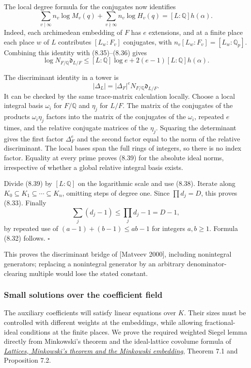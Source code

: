 \documentclass[
  11pt,
  a4paper,
]{article}
\begin{document}
The local degree formula for the conjugates now identifies \[
\sum_{v\mid\infty}n_v\log M_v(q)
+\sum_{v\nmid\infty}n_v\log H_v(q)
=[L:\mathbb Q]h(\alpha).
\] Indeed, each archimedean embedding of \(F\) has \(e\) extensions, and
at a finite place each place \(w\) of \(L\) contributes \([L_w:F_v]\)
conjugates, with \(n_v[L_w:F_v]=[L_w:\mathbb Q_p]\). Combining this
identity with (8.35)--(8.36) gives \[
\log N_{F/\mathbb Q}\mathfrak d_{L/F}
\le [L:\mathbb Q]\log e+
2(e-1)[L:\mathbb Q]h(\alpha).
\tag{8.38}
\]

The discriminant identity in a tower is \[
|\Delta_L|=|\Delta_F|^e
N_{F/\mathbb Q}\mathfrak d_{L/F}.
\tag{8.39}
\] It can be checked by the same trace-matrix calculation locally.
Choose a local integral basis \(\omega_i\) for \(F/\mathbb Q\) and
\(\eta_j\) for \(L/F\). The matrix of the conjugates of the products
\(\omega_i\eta_j\) factors into the matrix of the conjugates of the
\(\omega_i\), repeated \(e\) times, and the relative conjugate matrices
of the \(\eta_j\). Squaring the determinant gives the first factor
\(\Delta_F^e\) and the second factor equal to the norm of the relative
discriminant. The local bases span the full rings of integers, so there
is no index factor. Equality at every prime proves (8.39) for the
absolute ideal norms, irrespective of whether a global relative integral
basis exists.

Divide (8.39) by \([L:\mathbb Q]\) on the logarithmic scale and use
(8.38). Iterate along \(K_0\subseteq K_1\subseteq\cdots\subseteq K_n\),
omitting steps of degree one. Since \(\prod d_j=D\), this proves (8.33).
Finally \[
\sum_j(d_j-1)\le\prod_jd_j-1=D-1,
\] by repeated use of \((a-1)+(b-1)\le ab-1\) for integers \(a,b\ge1\).
Formula (8.32) follows. \(\square\)

This proves the discriminant bridge of {[}Matveev 2000{]}, including
nonintegral generators; replacing a nonintegral generator by an
arbitrary denominator-clearing multiple would lose the stated constant.

\subsubsection{Small solutions over the coefficient
field}\label{small-solutions-over-the-coefficient-field}

The auxiliary coefficients will satisfy linear equations over \(K\).
Their sizes must be controlled with different weights at the embeddings,
while allowing fractional-ideal conditions at the finite places. We
prove the required weighted Siegel lemma directly from Minkowski's
theorem and the ideal-lattice covolume formula of
\href{https://kokunoyumeto.github.io/open-math-courses-public/courses/NT-ANT/lattices-minkowskis-theorem-and-the-minkowski-embedding.html}{\emph{Lattices,
Minkowski's theorem and the Minkowski embedding}}, Theorem 7.1 and
Proposition 7.2.
\end{document}
